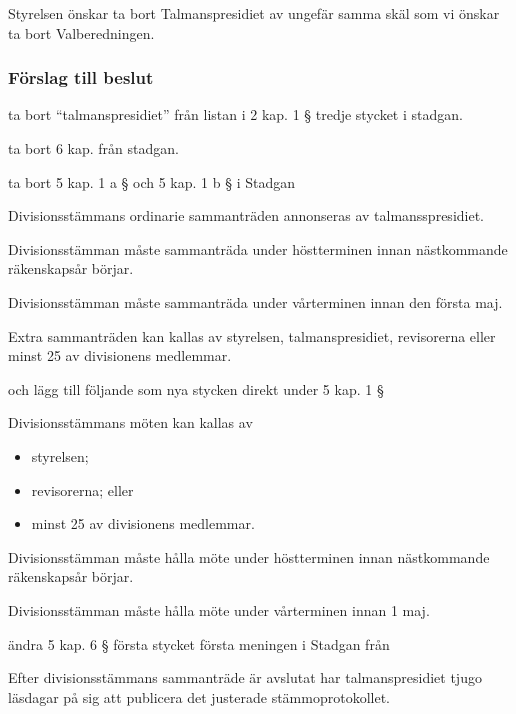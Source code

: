 \documentclass[protokoll]{dvd}
\begin{document}
Styrelsen önskar ta bort Talmanspresidiet av ungefär samma skäl som vi önskar ta bort Valberedningen.

\subsubsection*{Förslag till beslut}

\begin{attsatser}
	\item ta bort ``talmanspresidiet'' från listan i 2 kap. 1 § tredje stycket i stadgan.

	\item ta bort 6 kap. från stadgan.

	\item ta bort 5 kap. 1 a § och 5 kap. 1 b § i Stadgan

	\begin{displayquote}
		Divisionsstämmans ordinarie sammanträden annonseras av talmansspresidiet.

		Divisionsstämman måste sammanträda under höstterminen innan nästkommande räkenskapsår börjar.

		Divisionsstämman måste sammanträda under vårterminen innan den första maj.

		Extra sammanträden kan kallas av styrelsen, talmanspresidiet, revisorerna eller minst 25 av divisionens medlemmar.
	\end{displayquote}

	och lägg till följande som nya stycken direkt under 5 kap. 1 §

	\begin{displayquote}
		Divisionsstämmans möten kan kallas av

		\begin{itemize}
			\item styrelsen;
			\item revisorerna; eller
			\item minst 25 av divisionens medlemmar.
		\end{itemize}

		Divisionsstämman måste hålla möte under höstterminen innan nästkommande räkenskapsår börjar.

		Divisionsstämman måste hålla möte under vårterminen innan 1 maj.
	\end{displayquote}

	\item ändra 5 kap. 6 § första stycket första meningen i Stadgan från

	\begin{displayquote}
		Efter divisionsstämmans sammanträde är avslutat har talmanspresidiet tjugo läsdagar på sig att publicera det justerade stämmoprotokollet.
	\end{displayquote}


\end{attsatser}
\end{document}
